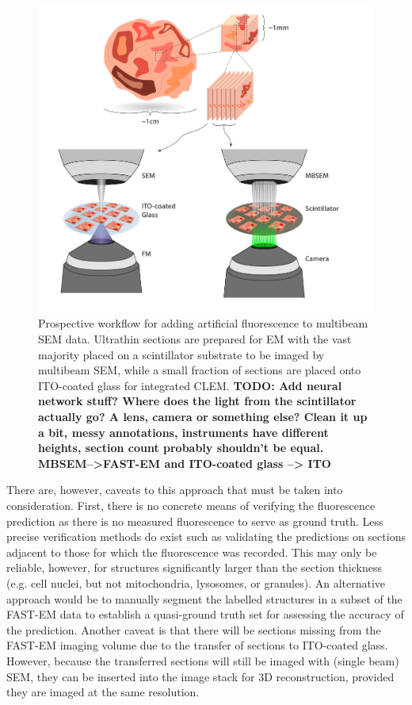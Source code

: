\begin{figure}[!tbh]
    \centering
    \includegraphics[width=\linewidth]{chapter-5/figures/multibeam_v1.pdf}
    \caption{Prospective workflow for adding artificial fluorescence to multibeam SEM data. Ultrathin sections are prepared for EM with the vast majority placed on a scintillator substrate to be imaged by multibeam SEM, while a small fraction of sections are placed onto ITO-coated glass for integrated CLEM.
    \textbf{TODO: Add neural network stuff? Where does the light from the scintillator actually go? A lens, camera or something else? Clean it up a bit, messy annotations, instruments have different heights, section count probably shouldn't be equal. MBSEM-->FAST-EM and ITO-coated glass --> ITO}}
    \label{fig:5.1_mbsem}
\end{figure}

There are, however, caveats to this approach that must be taken into consideration. First, there is no concrete means of verifying the fluorescence prediction as there is no measured fluorescence to serve as ground truth. Less precise verification methods do exist such as validating the predictions on sections adjacent to those for which the fluorescence was recorded. This may only be reliable, however, for structures significantly larger than the section thickness (e.g. cell nuclei, but not mitochondria, lysosomes, or granules). An alternative approach would be to manually segment the labelled structures in a subset of the FAST-EM data to establish a quasi-ground truth set for assessing the accuracy of the prediction. Another caveat is that there will be sections missing from the FAST-EM imaging volume due to the transfer of sections to ITO-coated glass. However, because the transferred sections will still be imaged with (single beam) SEM, they can be inserted into the image stack for 3D reconstruction, provided they are imaged at the same resolution.
